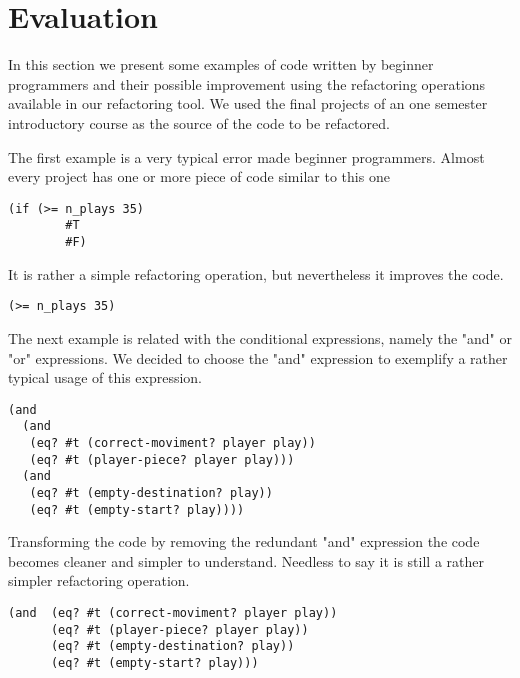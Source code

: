 



\section{Evaluation}
In this section we present some examples of code written by beginner programmers
and their possible improvement using the refactoring operations available in our
refactoring tool.
We used the final projects of an one semester introductory course as the source
of the code to be refactored.


\lstset{style=racket}

The first example is a very typical error made beginner programmers.
Almost every project has one or more piece of code similar to this one
\begin{lstlisting}[basicstyle=\ttfamily]
  (if (>= n_plays 35)
        #T
        #F)
\end{lstlisting}
It is rather a simple refactoring operation, but nevertheless it improves the code.
\begin{lstlisting}[basicstyle=\ttfamily]
  (>= n_plays 35)
\end{lstlisting}

The next example is related with the conditional expressions, namely the "and"
or "or" expressions. We decided to choose the "and" expression to exemplify a
rather typical usage of this expression.
\begin{lstlisting}[basicstyle=\ttfamily]
(and
  (and
   (eq? #t (correct-moviment? player play))
   (eq? #t (player-piece? player play)))
  (and
   (eq? #t (empty-destination? play))
   (eq? #t (empty-start? play))))
\end{lstlisting}


Transforming the code by removing the redundant "and" expression the code becomes
cleaner and simpler to understand. Needless to say it is still a rather simpler
refactoring operation.
\begin{lstlisting}[basicstyle=\ttfamily]
(and  (eq? #t (correct-moviment? player play))
      (eq? #t (player-piece? player play))
      (eq? #t (empty-destination? play))
      (eq? #t (empty-start? play)))
\end{lstlisting}

